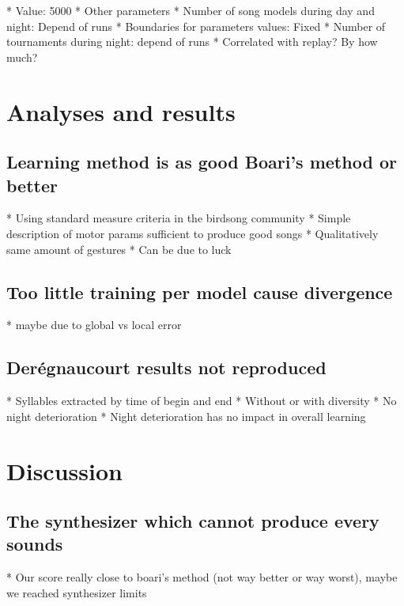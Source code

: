 \documentclass{report}
\begin{document}
        * Value: 5000
      * Other parameters
    * Number of song models during day and night: Depend of runs
  * Boundaries for parameters values: Fixed
  * Number of tournaments during night: depend of runs
        * Correlated with replay? By how much?

\chapter{Analyses and results}\label{analyses-and-results}

\section{Learning method is as good Boari's method or
better}\label{learning-method-is-as-good-boaris-method-or-better}

  * Using standard measure criteria in the birdsong community
  * Simple description of motor params sufficient to produce good songs
  * Qualitatively same amount of gestures
        * Can be due to luck

  \section{Too little training per model cause
divergence}\label{too-little-training-per-model-cause-divergence}

  * maybe due to global vs local error
\section{Derégnaucourt results not
reproduced}\label{deruxe9gnaucourt-results-not-reproduced}

  * Syllables extracted by time of begin and end
  * Without or with diversity
  * No night deterioration
  * Night deterioration has no impact in overall learning
\chapter{Discussion}\label{discussion}

\section{The synthesizer which cannot produce every
sounds}\label{the-synthesizer-which-cannot-produce-every-sounds}

  * Our score really close to boari's method (not way better or way
  worst), maybe we reached synthesizer limits
\end{document}
